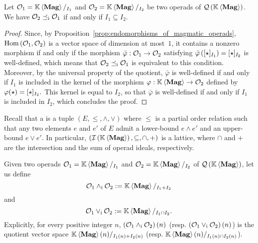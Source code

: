 \begin{Proposition} \label{prop:order_relations_on_QMag_and_ideals}
    Let $\mathcal{O}_1=\mathbb{K} \left\langle\mathbf{Mag}\right\rangle/_{I_1}$ and $\mathcal{O}_2=\mathbb{K} \left\langle\mathbf{Mag}\right\rangle/_{I_2}$ be two operads
    of $\mathcal{Q}\left(\mathbb{K} \left\langle\mathbf{Mag}\right\rangle\right)$. We have $\mathcal{O}_2\preceq_{\mathrm{i}}\mathcal{O}_1$ if and only if
    $I_1\subseteq I_2$.
\end{Proposition}
\begin{proof}
    Since, by Proposition~\ref{prop:endomorphisms_of_magmatic_operads},
    $\mathrm{Hom}\left(\mathcal{O}_1,\mathcal{O}_2\right)$ is a vector space of
    dimension at most~$1$, it contains a nonzero morphism if and only if
    the morphism $\bar{\varphi}:\mathcal{O}_1\to\mathcal{O}_2$ satisfying
    \begin{math}
        \bar{\varphi}\left([\operatorname{\star}]_{I_1}\right) = [\operatorname{\star}]_{I_2}
    \end{math}
    is well-defined, which means that $\mathcal{O}_2\preceq_{\mathrm{i}}\mathcal{O}_1$ is
    equivalent to this condition. Moreover, by the universal property
    of the quotient, $\bar{\varphi}$ is well-defined if and only if
    $I_1$ is included in the kernel of the morphism
    $\varphi:\mathbb{K} \left\langle\mathbf{Mag}\right\rangle\to\mathcal{O}_2$ defined by
    \begin{math}
        \varphi(\operatorname{\star}) = [\operatorname{\star}]_{I_2}.
    \end{math}
    This kernel is equal to $I_2$, so that $\bar{\varphi}$ is
    well-defined if and only if $I_1$ is included in $I_2$, which
    concludes the proof.
\end{proof}
\medbreak

Recall that a  is a tuple
$\left(E,\leq,\wedge,\vee\right)$ where $\leq$ is a partial order
relation such that any two elements $e$ and $e'$ of $E$ admit a
lower-bound $e\wedge e'$ and an upper-bound $e\vee e'$. In particular,
$\left(\mathcal{I}\left(\mathbb{K} \left\langle\mathbf{Mag}\right\rangle\right),\subseteq,\cap,+\right)$ is a lattice, where $\cap$ and $+$
are the intersection and the sum of operad ideals, respectively.
\medbreak

Given two operads $\mathcal{O}_1=\mathbb{K} \left\langle\mathbf{Mag}\right\rangle/_{I_1}$ and $\mathcal{O}_2=\mathbb{K} \left\langle\mathbf{Mag}\right\rangle/_{I_2}$ of
$\mathcal{Q}\left(\mathbb{K} \left\langle\mathbf{Mag}\right\rangle\right)$, let us define
\begin{equation} \label{equ:inf_QMag}
    \mathcal{O}_1\wedge_{\mathrm{i}} \mathcal{O}_2 := \mathbb{K} \left\langle\mathbf{Mag}\right\rangle/_{I_1+I_2}
\end{equation}
and
\begin{equation} \label{equ:sup_QMag}
    \mathcal{O}_1\vee_{\mathrm{i}} \mathcal{O}_2 := \mathbb{K} \left\langle\mathbf{Mag}\right\rangle/_{I_1\cap I_2}.
\end{equation}
Explicitly, for every positive integer $n$,
$\left(\mathcal{O}_1\wedge_{\mathrm{i}}\mathcal{O}_2\right)(n)$ (resp.
$\left(\mathcal{O}_1\vee_{\mathrm{i}}\mathcal{O}_2\right)(n)$) is the quotient vector space
$\mathbb{K} \left\langle\mathbf{Mag}\right\rangle(n)/_{I_1(n)+I_2(n)}$ (resp.
$\mathbb{K} \left\langle\mathbf{Mag}\right\rangle(n)/_{I_1(n)\cap I_2(n)}$).
\medbreak

